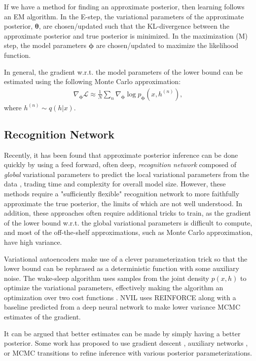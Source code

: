 \documentclass{article} %
\newcommand{\vects}[1]{\boldsymbol{#1}}
\newcommand{\TT}[0]{\vects{\theta}}
\newcommand{\PP}[0]{\vects{\phi}}
\newcommand{\LL}[0]{\mathcal{L}}
\begin{document}
If we have a method for finding an approximate posterior, then learning follows an
EM algorithm.  In the E-step, the variational parameters of the approximate posterior, $\TT$,
are chosen/updated such that the KL-divergence between the approximate posterior and
true posterior is minimized. In the maximization (M) step, the model parameters
$\PP$ are chosen/updated to maximize the likelihood function.

In general, the gradient w.r.t. the model parameters of the lower bound can be
estimated using the following Monte Carlo approximation:
\begin{align} \label{eq:grad}
\nabla_{\PP} \LL \approx \frac{1}{N} \sum_n \nabla_{\PP} \log p_{\PP}(x, h^{(n)}),
\end{align}
where $h^{(n)} \sim q(h|x)$.

\subsection{Recognition Network}

Recently, it has been found that approximate posterior inference can be done
quickly by using a feed forward, often deep, \emph{recognition network} composed
of \emph{global} variational parameters to predict the local variational
parameters from the data \citep[see,
e.g.,][]{kingma2013auto,mnih2014neural,rezende2014stochastic}, trading time and complexity for overall model size. However, these methods require a "sufficiently flexible" recognition network to more faithfully approximate the true posterior, the limits of which are not well understood. In addition, these approaches often require additional tricks to train, as the gradient of the
lower bound w.r.t. the global variational parameters is difficult to compute,
and most of the off-the-shelf approximations, such as Monte Carlo approximation,
have high variance. 

Variational autoencoders \citep[VAE,][]{kingma2013auto} make use of a clever
parameterization trick so that the lower bound can be rephrased as a
deterministic function with some auxiliary noise. The wake-sleep algorithm uses
samples from the joint density $p(x, h)$ to optimize the variational parameters,
effectively making the algorithm an optimization over two cost functions
\citep{hinton1995wake}. NVIL
uses REINFORCE \citep{williams1992simple} along with a baseline predicted from a deep neural network to
make lower variance MCMC estimates of the gradient.

It can be argued that better estimates can be made by simply having a better
posterior. Some work has proposed to use gradient descent
\citep{hoffman2013stochastic}, auxiliary networks
\citep{rezende2015variational}, or MCMC transitions \citep{salimans2014markov}
to refine inference with various posterior parameterizations. 
\end{document}
